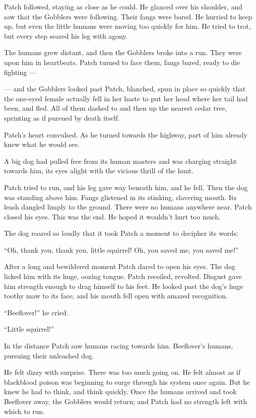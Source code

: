 \documentclass[ebook,oneside,openany,17pt]{memoir}
\newenvironment{tolerant}[1]{%
  \par\tolerance=#1\relax
}{%
  \par
}
\begin{document}
Patch followed, staying as close as he could. He glanced over his
shoulder, and saw that the Gobblers were following. Their fangs were
bared. He hurried to keep up, but even the little humans were moving
too quickly for him. He tried to trot, but every step seared his leg
with agony.

The humans grew distant, and then the Gobblers broke into a run. They
were upon him in heartbeats. Patch turned to face them, fangs bared,
ready to die fighting —

— and the Gobblers looked past Patch, blanched, spun in place so
quickly that the one-eyed female actually fell in her haste to put her
head where her tail had been, and fled. All of them dashed to and then
up the nearest cedar tree, sprinting as if pursued by death itself.

Patch’s heart convulsed. As he turned towards the highway, part of him
already knew what he would see.

A big dog had pulled free from its human masters and was charging
straight towards him, its eyes alight with the vicious thrill of the
hunt.

Patch tried to run, and his leg gave way beneath him, and he
fell. Then the dog was standing above him. Fangs glistened in its
stinking, slavering mouth. Its leash dangled limply to the
ground. There were no humans anywhere near. Patch closed his
eyes. This was the end. He hoped it wouldn’t hurt too much.

The dog roared so loudly that it took Patch a moment to decipher its
words:

“Oh, thank you, thank you, little squirrel! Oh, you saved me, you
saved me!”

After a long and bewildered moment Patch dared to open his eyes. The
dog licked him with its huge, oozing tongue. Patch recoiled,
revolted. Disgust gave him strength enough to drag himself to his
feet. He looked past the dog’s huge toothy maw to its face, and his
mouth fell open with amazed recognition.

“Beeflover!” he cried.

“Little squirrel!”

In the distance Patch saw humans racing towards him. Beeflover’s
humans, pursuing their unleashed dog.

\begin{tolerant}{5000}
He felt dizzy with surprise. There was too much going on. He felt
almost as if blackblood poison was beginning to surge through his
system once again. But he knew he had to think, and think
quickly. Once the humans arrived and took Beeflover away, the Gobblers
would return; and Patch had no strength left with which to run.
\end{tolerant}
\end{document}
